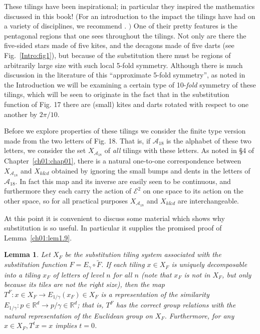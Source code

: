 \documentclass[reqno]{stml-l}
\theoremstyle{plain}
\newtheorem{lemma}[theorem]{Lemma}
\theoremstyle{definition}
\numberwithin{equation}{chapter}
\begin{document}
These tilings have been inspirational; in particular they inspired the mathematics discussed in this book! (For an introduction to the impact the tilings have had on a variety of disciplines, we recommend \cite{bib:Sen}. $)$ One of their pretty features is the pentagonal regions that one sees throughout the tilings. Not only are there the five-sided stars made of five kites, and the decagons made of five darts (see Fig.~\ref{Intro:fig1}), but because of the substitution there must be regions of arbitrarily large size with such local 5-fold symmetry. Although there is much discussion in the literature of this ``approximate 5-fold symmetry'', as noted in the Introduction we will be examining a certain type of 10-\emph{fold} symmetry of these tilings, which will be seen to originate in the fact that in the substitution function of Fig. 17 there are (small) kites and darts rotated with respect to one another by $2\pi/10$.

Before we explore properties of these tilings we consider the finite type version made from the two letters of Fig. 18. That is, if $\mathcal{A}_{18}$ is the alphabet of these two letters, we consider the set $X_{\mathcal{A}_{18}}$ of \emph{all} tilings with these letters. As noted in \S 4 of Chapter~\ref{ch01:chap01}, there is a natural one-to-one correspondence between $X_{\mathcal{A}_{18}}$ and $X_{k\& d}$ obtained by ignoring the small bumps and dents in the letters of $\mathcal{A}_{18}$. In fact this map and its inverse are easily seen to be continuous, and furthermore they each carry the action of $\mathcal{E}^{2}$ on one space to its action on the other space, so for all practical purposes $X_{\mathcal{A}_{18}}$ and $X_{k\& d}$ are interchangeable.

At this point it is convenient to discuss some material which shows why substitution is so useful. In particular it supplies the promised proof of Lemma~\ref{ch01:lem1.9}.

\begin{lemma}\label{ch04:lem4.1}
Let $X_{F}$ be the substitution tiling system associated with the substitution function $F=E_{\gamma}\circ\tilde{F}$. If each tiling $x\in X_{F}$ is uniquely decomposable into a tiling $x_{F}$ of letters of level $n$ for all $n$ (note that $x_{F}$ is not in $X_{F}$, but only because its tiles are not the right size), then the map $T^{F}:x\in X_{F}\rightarrow E_{1/\gamma}(x_{F})\in X_{F}$ is a representation of the similarity $E_{1/\gamma}:p\in \mathbb{R}^{d}\rightarrow p/\gamma\in \mathbb{R}^{d}$; that is, $T^{F}$ has the correct group relations with the natural representation of the Euclidean group on $X_{F}$. Furthermore, for any $x\in X_{F},T^{t}x=x$ implies $t=0$.
\end{lemma}
\end{document}
